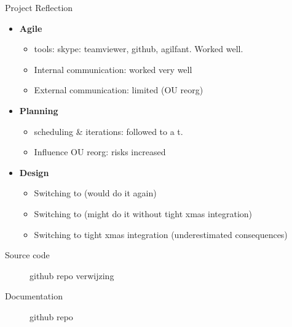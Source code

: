 \documentclass[11pt]{beamer}
\begin{document}
\begin{frame}{Project Reflection}
	\begin{itemize}
		\item {\bf Agile} 
				\begin{itemize}
					\item tools: skype: teamviewer, github, agilfant. Worked well.
					\item Internal communication: worked very well
					\item External communication: limited (OU reorg)
				\end{itemize}
		\item {\bf Planning}
				\begin{itemize}
					\item scheduling \& iterations: followed to a t.
					\item Influence OU reorg: risks increased
				\end{itemize}
		\item {\bf Design} 
			\begin{itemize}
				\item Switching to \qt				 (would do it again)
				\item Switching to \qml				 (might do it without tight xmas integration)
				\item Switching to tight xmas integration (underestimated consequences)
			\end{itemize}
	\end{itemize}
\end{frame}

\begin{frame}
	\begin{description}
		\item[Source code] github repo verwijzing
		\item[Documentation] github repo
	\end{description}
\end{frame}
\end{document}
